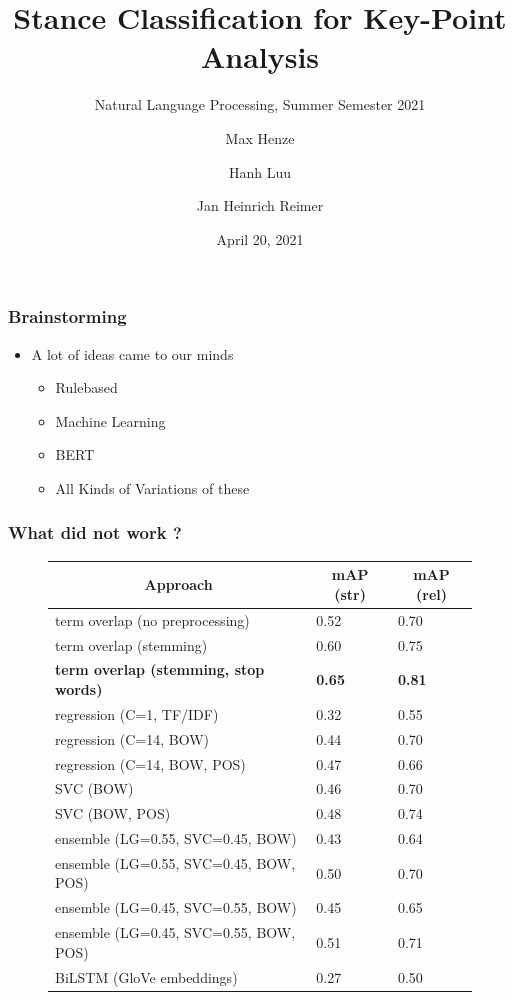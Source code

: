 \documentclass[english,handout]{mlutalk}
\title{Stance Classification for Key-Point Analysis}
\subtitle{Natural Language Processing, Summer Semester 2021}
\author{Max Henze \and Hanh Luu \and Jan Heinrich Reimer}
\institute{Martin Luther University Halle-Wittenberg}
\date{April 20, 2021}
\begin{document}
\titleframe

\begin{frame}
  \frametitle{Brainstorming}

  \begin{itemize}
    \item A lot of ideas came to our minds
    \begin{itemize}
      \item Rulebased
      \item Machine Learning
      \item BERT
      \item All Kinds of Variations of these
    \end{itemize}   
  \end{itemize}

\end{frame}

\begin{frame}
  \frametitle{What did not work ?}

  \begin{figure}
    \centering
    \begin{tabular}{lll}
      \toprule
      \multicolumn{1}{c}{\textbf{Approach}} & \multicolumn{1}{c}{\textbf{mAP (str)}} & \multicolumn{1}{c}{\textbf{mAP (rel)}}\\
      \midrule
      term overlap (no preprocessing) &	0.52 & 0.70 \\
      term overlap (stemming) &	0.60 & 0.75\\
      \textbf{term overlap (stemming, stop words)} & \textbf{0.65} & \textbf{0.81}\\
      regression (C=1, TF/IDF) & 0.32 & 0.55\\
      regression (C=14, BOW) & 0.44 & 0.70\\
      regression (C=14, BOW, POS) & 0.47 & 0.66\\
      SVC (BOW) & 0.46 & 0.70\\
      SVC (BOW, POS) & 0.48 & 0.74\\
      ensemble (LG=0.55, SVC=0.45, BOW) & 0.43 & 0.64\\
      ensemble (LG=0.55, SVC=0.45, BOW, POS) & 0.50 & 0.70\\
      ensemble (LG=0.45, SVC=0.55, BOW) & 0.45 & 0.65\\
      ensemble (LG=0.45, SVC=0.55, BOW, POS) & 0.51 & 0.71\\
      BiLSTM (GloVe embeddings) & 0.27 & 0.50\\
      \bottomrule
    \end{tabular}
  \end{figure}
  

\end{frame}
\end{document}
